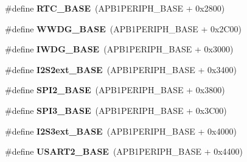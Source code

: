 \begin{DoxyCompactItemize}
\item 
\hypertarget{group___peripheral__memory__map_ga4265e665d56225412e57a61d87417022}{\#define {\bfseries R\-T\-C\-\_\-\-B\-A\-S\-E}~(A\-P\-B1\-P\-E\-R\-I\-P\-H\-\_\-\-B\-A\-S\-E + 0x2800)}\label{group___peripheral__memory__map_ga4265e665d56225412e57a61d87417022}

\item 
\hypertarget{group___peripheral__memory__map_ga9a5bf4728ab93dea5b569f5b972cbe62}{\#define {\bfseries W\-W\-D\-G\-\_\-\-B\-A\-S\-E}~(A\-P\-B1\-P\-E\-R\-I\-P\-H\-\_\-\-B\-A\-S\-E + 0x2\-C00)}\label{group___peripheral__memory__map_ga9a5bf4728ab93dea5b569f5b972cbe62}

\item 
\hypertarget{group___peripheral__memory__map_ga8543ee4997296af5536b007cd4748f55}{\#define {\bfseries I\-W\-D\-G\-\_\-\-B\-A\-S\-E}~(A\-P\-B1\-P\-E\-R\-I\-P\-H\-\_\-\-B\-A\-S\-E + 0x3000)}\label{group___peripheral__memory__map_ga8543ee4997296af5536b007cd4748f55}

\item 
\hypertarget{group___peripheral__memory__map_gaa5f7b241ed5b756decd835300c9e7bc9}{\#define {\bfseries I2\-S2ext\-\_\-\-B\-A\-S\-E}~(A\-P\-B1\-P\-E\-R\-I\-P\-H\-\_\-\-B\-A\-S\-E + 0x3400)}\label{group___peripheral__memory__map_gaa5f7b241ed5b756decd835300c9e7bc9}

\item 
\hypertarget{group___peripheral__memory__map_gac3e357b4c25106ed375fb1affab6bb86}{\#define {\bfseries S\-P\-I2\-\_\-\-B\-A\-S\-E}~(A\-P\-B1\-P\-E\-R\-I\-P\-H\-\_\-\-B\-A\-S\-E + 0x3800)}\label{group___peripheral__memory__map_gac3e357b4c25106ed375fb1affab6bb86}

\item 
\hypertarget{group___peripheral__memory__map_gae634fe8faa6922690e90fbec2fc86162}{\#define {\bfseries S\-P\-I3\-\_\-\-B\-A\-S\-E}~(A\-P\-B1\-P\-E\-R\-I\-P\-H\-\_\-\-B\-A\-S\-E + 0x3\-C00)}\label{group___peripheral__memory__map_gae634fe8faa6922690e90fbec2fc86162}

\item 
\hypertarget{group___peripheral__memory__map_ga89b61d6e6b09e94f3fccb7bef34e0263}{\#define {\bfseries I2\-S3ext\-\_\-\-B\-A\-S\-E}~(A\-P\-B1\-P\-E\-R\-I\-P\-H\-\_\-\-B\-A\-S\-E + 0x4000)}\label{group___peripheral__memory__map_ga89b61d6e6b09e94f3fccb7bef34e0263}

\item 
\hypertarget{group___peripheral__memory__map_gade83162a04bca0b15b39018a8e8ec090}{\#define {\bfseries U\-S\-A\-R\-T2\-\_\-\-B\-A\-S\-E}~(A\-P\-B1\-P\-E\-R\-I\-P\-H\-\_\-\-B\-A\-S\-E + 0x4400)}\label{group___peripheral__memory__map_gade83162a04bca0b15b39018a8e8ec090}


\end{DoxyCompactItemize}
